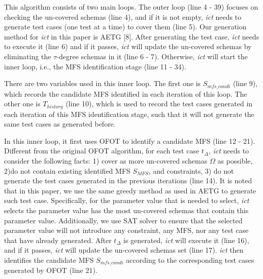 \documentclass[10pt,journal,compsoc]{IEEEtran}
\begin{document}
This algorithm consists of two main loops. The outer loop  (line 4 - 39) focuses on checking the un-covered schemas (line 4), and if it is not empty, \emph{ict} needs to generate test cases (one test at a time) to cover them (line 5). Our generation method for \emph{ict} in this paper is AETG [8]. After generating the test case, \emph{ict} needs to execute it (line 6) and  if it passes, \emph{ict} will update the un-covered schemas by eliminating the $\tau$-degree schemas in it (line 6 - 7). Otherwise, \emph{ict} will start the inner loop, i.e., the MFS identification stage (line 11 - 34).


There are two variables used in this inner loop. The first one is $S_{mfs\_candi}$ (line 9), which records the candidate MFS identified in each iteration of this loop. The other one is $T_{history}$ (line 10), which is used to record the test cases generated in each iteration of this MFS identification stage, such that it will not generate the same test cases as generated before.

In this inner loop, it first uses OFOT to identify a candidate MFS (line 12 - 21). Different from the original OFOT algorithm, for each test case $t_{\Delta}$, \emph{ict} needs to consider the following facts: 1) cover as more un-covered schemas $\Omega$ as possible, 2)do not contain existing identified MFS $S_{MFS}$,  and constraints, 3) do not generate the  test cases generated in the previous iterations (line 14).  It is noted that in this paper, we use the same greedy method as used in AETG to generate such test case. Specifically, for the parameter value that is  needed to select, \emph{ict} selects the parameter value has the most un-covered schemas that contain this parameter value. Additionally, we use SAT solver to ensure that the selected parameter value will not introduce any constraint, any MFS, nor any test case that have already generated.  After $t_{\Delta}$ is generated, \emph{ict} will execute it (line 16), and if it passes, \emph{ict} will update the un-covered schemas set (line 17). \emph{ict} then identifies the candidate MFS $S_{mfs\_candi}$ according to the corresponding test cases generated by OFOT (line 21).
\end{document}
